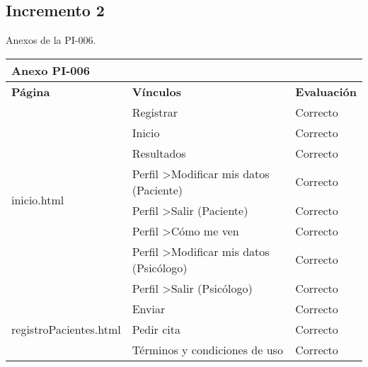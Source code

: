 \subsection{Incremento 2}

Anexos de la PI-006.

\begin{table}[htpb]
\centering
\begin{tabularx}{\textwidth}{|l|X|l|}
\hline
\multicolumn{3}{|l|}{\textbf{Anexo PI-006}}                                                                            \\ \hline
\textbf{Página}                           & \textbf{Vínculos}                                   & \textbf{Evaluación} \\ \hline
\multirow{8}{*}{inicio.html}              & Registrar                                           & Correcto            \\ \cline{2-3} 
                                          & Inicio                                              & Correcto            \\ \cline{2-3} 
                                          & Resultados                                          & Correcto            \\ \cline{2-3} 
                                          & Perfil \textgreater Modificar mis datos (Paciente)  & Correcto            \\ \cline{2-3} 
                                          & Perfil \textgreater Salir (Paciente)                & Correcto            \\ \cline{2-3} 
                                          & Perfil \textgreater Cómo me ven                     & Correcto            \\ \cline{2-3} 
                                          & Perfil \textgreater Modificar mis datos (Psicólogo) & Correcto            \\ \cline{2-3} 
                                          & Perfil \textgreater Salir (Psicólogo)               & Correcto            \\ \hline
\multirow{3}{*}{registroPacientes.html}   & Enviar                                              & Correcto            \\ \cline{2-3} 
                                          & Pedir cita                                          & Correcto            \\ \cline{2-3} 
                                          & Términos y condiciones de uso                       & Correcto            \\ \hline

\end{tabularx}
\end{table}
